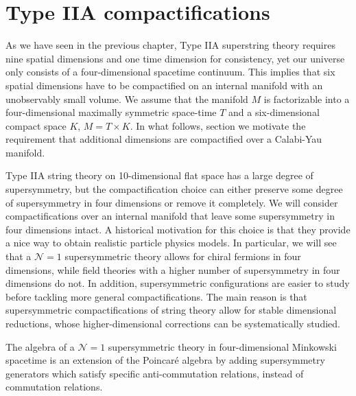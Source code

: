 \chapter{Type IIA compactifications}

As we have seen in the previous chapter, Type IIA superstring theory requires nine spatial dimensions and one time dimension for consistency, yet our universe only consists of a four-dimensional spacetime continuum. This implies that six spatial dimensions have to be compactified on an internal manifold with an unobservably small volume.
We assume that the manifold $M$ is factorizable into a four-dimensional maximally symmetric space-time $T$ and a six-dimensional compact space $K$,
$M =  T\times K$.
In what follows, section we motivate the requirement that additional dimensions are compactified
over a Calabi-Yau manifold.

Type IIA string theory on 10-dimensional flat space has a large degree of supersymmetry,
but the compactification choice can either preserve some degree of supersymmetry in four dimensions or remove it completely.
We will consider compactifications over an internal manifold that leave some supersymmetry in four dimensions intact.
A historical motivation for this choice is that they provide a nice way to obtain realistic particle 
physics models. 
In particular, we will see that a $\mathcal N=1$ supersymmetric theory allows for chiral fermions in four dimensions, while field theories with a higher number of supersymmetry in four dimensions do not.
In addition, supersymmetric configurations are easier to study before tackling more general compactifications.
The main reason is that supersymmetric compactifications of string theory allow  for stable dimensional reductions, whose higher-dimensional corrections can be systematically studied.

The algebra of a $\mathcal N=1$ supersymmetric theory in four-dimensional Minkowski spacetime is an extension of the Poincaré algebra by adding
 supersymmetry generators which satisfy specific anti-commutation relations, instead of commutation relations. 

